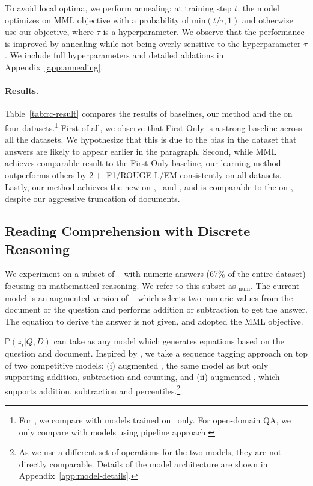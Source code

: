 \documentclass[11pt,a4paper]{article}
\begin{document}
To avoid local optima, we perform annealing: at training step $t$, the model optimizes on MML objective with a probability of $\mathrm{min} (t/\tau{}, 1)$ and otherwise use our objective, where $\tau{}$ is a hyperparameter. We observe that the performance is improved by annealing while not being overly sensitive to the hyperparameter $\tau{}$. We include full hyperparameters and detailed ablations in Appendix~\ref{app:annealing}.


\paragraph{Results.}
Table~\ref{tab:rc-result} compares the results of baselines, our method and the \sota{} on four datasets.\footnote{For \narrative, we compare with models trained on \narrative\ only. For open-domain QA, we only compare with models using pipeline approach.} First of all, we observe that First-Only is a strong baseline across all the datasets. We hypothesize that this is due to the bias in the dataset that answers are likely to appear earlier in the paragraph.
Second, while MML achieves comparable result to the First-Only baseline, our learning method outperforms others by $2+$ F1/ROUGE-L/EM consistently on all datasets.
Lastly, our method achieves the new \sota{} on \narrative{}, \triviaopen\ and \nqopen, and is comparable to the \sota{} on \trivia{}, despite our aggressive truncation of documents. 


\subsection{Reading Comprehension with Discrete Reasoning}\label{subsec:descrete-reasoning-result}
We experiment on a subset of \drop~\citep{drop} with numeric answers (67\% of the entire dataset) focusing on mathematical reasoning. We refer to this subset as  \drop{}$_\text{num}$. The current \sota{} model is an augmented version of \qanet{}~\cite{fast-and-accurate} which selects two numeric values from the document or the question and performs addition or subtraction to get the answer. The equation to derive the answer is not given, and \citet{drop} adopted the MML objective.


$\mathbb{P}(z_i|Q, D)$ can take as any model which generates equations based on the question and document. Inspired by \citet{drop}, we take a sequence tagging approach on top of two competitive models: (i) augmented \qanet{}, the same model as \citet{drop} but only supporting addition, subtraction and counting, and (ii) augmented \bert{}, which supports addition, subtraction and percentiles.\footnote{As we use a different set of operations for the two models, they are not directly comparable. Details of the model architecture are shown in Appendix~\ref{app:model-details}.} 
\end{document}
